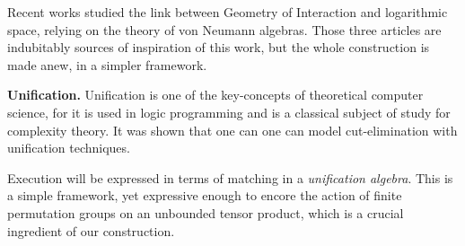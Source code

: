 Recent works \cite{girard_normativity_2012,aubert_characterizing_2012,seiller_logarithmic_2013} studied the link between Geometry of Interaction and logarithmic space, relying on the theory of von Neumann algebras.
Those three articles are indubitably sources of inspiration of this work, but the whole construction is made anew, in a simpler framework.
%

\smallskip\noindent
\textbf{Unification.} 
Unification is one of the key-concepts of theoretical computer science, for it is used in logic programming and is a classical subject of study for complexity theory.
It was shown \cite{girard_geometry_1995,girard_three_lightings} that one can one can model \hbox{cut-elimination} with unification techniques.
%

Execution will be expressed in terms of matching in a \emph{unification algebra}. This is a simple framework, yet expressive enough to encore the action of finite permutation groups on an unbounded tensor product, which is a crucial ingredient of our construction.
%

